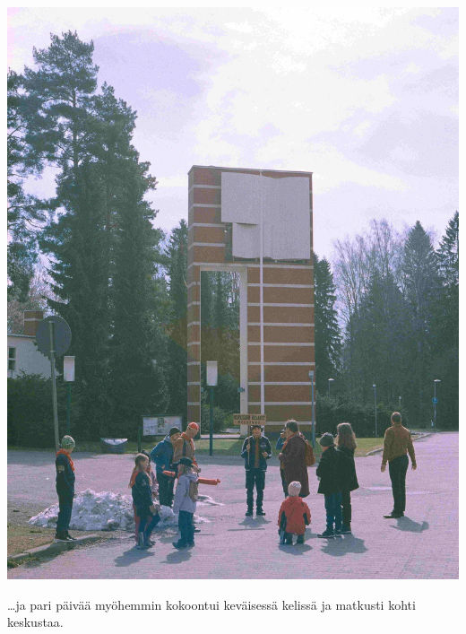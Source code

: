 \begin{multicols}{2}
	\begin{center}
		\noindent\includegraphics[width=0.85\linewidth]{assets/paraati2}
	\end{center}

	\vspace*{-0.32cm}
	\ldots ja pari päivää myöhemmin kokoontui keväisessä kelissä ja matkusti kohti keskustaa.

\end{multicols}
